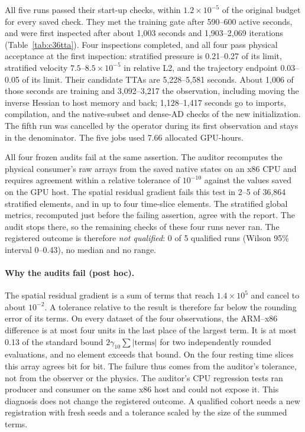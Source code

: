 \documentclass[11pt]{article}
\begin{document}
All five runs passed their start-up checks, within $1.2\times10^{-5}$ of
the original budget for every saved check. They met the training gate after
590--600 active seconds, and were first inspected after about 1,003 seconds
and 1,903--2,069 iterations (Table~\ref{tab:c36tta}). Four inspections
completed, and all four pass physical acceptance at the first inspection:
stratified pressure is 0.21--0.27 of its limit, stratified velocity
$7.5$--$8.5\times10^{-5}$ in relative L2, and the trajectory endpoint
0.03--0.05 of its limit. Their candidate TTAs are 5,228--5,581 seconds.
About 1,006 of those seconds are training and 3,092--3,217 the observation,
including moving the inverse Hessian to host memory and back;
1,128--1,417 seconds go to imports, compilation, and the native-subset and
dense-AD checks of the new initialization. The fifth run was cancelled by
the operator during its first observation and stays in the denominator. The five jobs used 7.66 allocated GPU-hours.

All four frozen audits fail at the same assertion. The auditor recomputes
the physical consumer's raw arrays from the saved native states on an x86
CPU and requires agreement within a relative tolerance of $10^{-10}$
against the values saved on the GPU host. The spatial residual gradient
fails this test in 2--5 of 36,864 stratified elements, and in up to four
time-slice elements. The stratified global metrics, recomputed just before
the failing assertion, agree with the report. The audit stops there, so
the remaining checks of these four runs never ran. The registered outcome is therefore
\emph{not qualified}: 0 of 5 qualified runs (Wilson 95\% interval 0--0.43),
no median and no range.

\paragraph{Why the audits fail (post hoc).}
The spatial residual gradient is a sum of terms that reach $1.4\times10^5$
and cancel to about $10^{-2}$. A tolerance relative to the result is
therefore far below the rounding error of its terms. On every dataset of
the four observations, the ARM--x86 difference is at most four units in
the last place of the largest term. It is at most 0.13 of the standard
bound $2\gamma_{10}\sum|\text{terms}|$ for two independently rounded
evaluations, and no element exceeds that bound. On the four resting time
slices this array agrees bit for bit. The failure thus comes from the auditor's
tolerance, not from the observer or the physics. The auditor's CPU
regression tests ran producer and consumer on the same x86 host and could
not expose it. This diagnosis does not change the registered outcome. A
qualified cohort needs a new registration with fresh seeds and a tolerance
scaled by the size of the summed terms.
\end{document}
